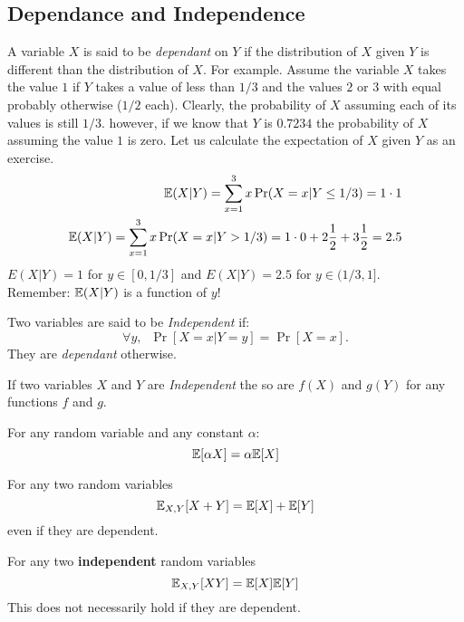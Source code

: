 \subsection{Dependance and Independence}
A variable $X$ is said to be {\it dependant} on $Y$ if the distribution of $X$ given $Y$ is different than the distribution of $X$. 
For example. Assume the variable $X$ takes the value $1$ if $Y$ takes a
value of less than $1/3$ and the values $2$ or $3$ with equal probably otherwise ($1/2$ each).
%
Clearly, the probability of $X$ assuming each of its values is still
$1/3$. however, if we know that $Y$ is $0.7234$ the probability of
$X$ assuming the value $1$ is zero. Let us calculate the expectation of $X$ given $Y$ as an exercise.
\begin{eqnarray}
{\mathbb E}(X | Y) = \sum_{x=1}^{3} x \Pr(X = x | Y \le 1/3) = 1\cdot 1\\
{\mathbb E}(X | Y) = \sum_{x=1}^{3} x \Pr(X = x | Y > 1/3) = 1\cdot 0 + 2
\frac{1}{2} + 3\frac{1}{2}  = 2.5
\end{eqnarray}
$E(X | Y) = 1$ for $y \in [0,1/3]$ and $E(X | Y) = 2.5$ for $y \in (1/3,1]$.\\
Remember: ${\mathbb E}(X | Y)$ is a function of $y$!

\begin{definition}[Independence]
Two variables are said to be {\it Independent} if:
\[
\forall y,\;\;\Pr[ X=x | Y = y] = \Pr[X=x].
\]
They are {\it dependant} otherwise.
\end{definition}


\begin{fact}
If two variables $X$ and $Y$ are {\it Independent} the so are $f(X)$ and $g(Y)$ for any functions $f$ and $g$.
\end{fact}


\begin{fact}%
For any random variable and any constant $\alpha$:
\begin{equation}
{\mathbb E}[\alpha X] = \alpha {\mathbb E}[X]
\end{equation}
\end{fact}

\begin{fact}%
For any two random variables
\begin{equation}
{\mathbb E}_{X,Y}[X+Y] = {\mathbb E}[X] + {\mathbb E}[Y]
\end{equation}
even if they are dependent.
\end{fact}


\begin{fact}%
For any two {\bf independent} random variables
\begin{equation}
{\mathbb E}_{X,Y}[XY] = {\mathbb E}[X]{\mathbb E}[Y]
\end{equation}
This does not necessarily hold if they are dependent.
\end{fact}

